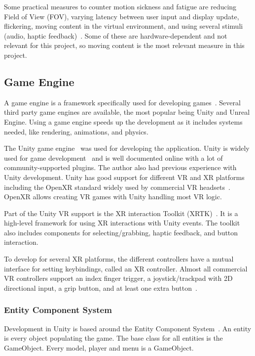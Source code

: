 \documentclass[a4paper]{report}
\begin{document}
Some practical measures to counter motion sickness and fatigue are reducing Field of View (FOV), varying latency between user input and display update, flickering, moving content in the virtual environment, and using several stimuli (audio, haptic feedback)~\cite{chang_virtual_2020}. 
Some of these are hardware-dependent and not relevant for this project, so moving content is the most relevant measure in this project.

\subsection{Game Engine}
A game engine is a framework specifically used for developing games~\cite{gameengine_what_nodate}. Several third party game engines are available, the most popular being Unity and Unreal Engine.
Using a game engine speeds up the development as it includes systems needed, like rendering, animations, and physics.

The Unity game engine~\cite{technologies_unity_nodate} was used for developing the application. Unity is widely used for game development~\cite{doucet_game_2021} and is well documented online with a lot of community-supported plugins. The author also had previous experience with Unity development.
Unity has good support for different VR and XR platforms~\cite{technologies_unity_nodate-3} including the OpenXR standard widely used by commercial VR headsets~\cite{noauthor_openxr_2016}. OpenXR allows creating VR games with Unity handling most VR logic.

Part of the Unity VR support is the XR interaction Toolkit (XRTK)~\cite{noauthor_xr_nodate}. It is a high-level framework for using XR interactions with Unity events. The toolkit also includes components for selecting/grabbing, haptic feedback, and button interaction.

To develop for several XR platforms, the different controllers have a mutual interface for setting keybindings, called an XR controller. Almost all commercial VR controllers support an index finger trigger, a joystick/trackpad with 2D directional input, a grip button, and at least one extra button~\cite{technologies_unity_nodate}.

\subsubsection{Entity Component System}
Development in Unity is based around the Entity Component System~\cite{entitycomponent_entities_nodate}. An entity is every object populating the game. The base class for all entities is the GameObject. Every model, player and menu is a GameObject.
\end{document}
